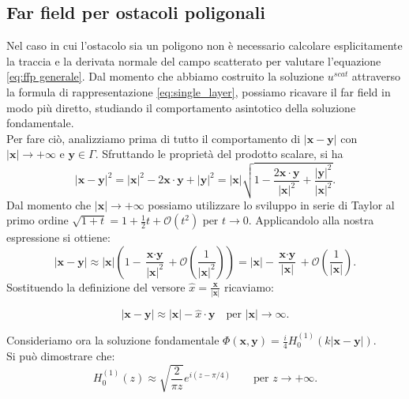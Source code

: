 \documentclass[a4paper,12pt]{article}
\theoremstyle{definition}
\begin{document}
\subsection{Far field per ostacoli poligonali}
Nel caso in cui l'ostacolo sia un poligono non è necessario calcolare esplicitamente la traccia e la derivata normale del campo scatterato per valutare l'equazione \ref{eq:ffp generale}. Dal momento che abbiamo costruito la soluzione $u^{scat}$ attraverso la formula di rappresentazione \ref{eq:single_layer}, possiamo ricavare il far field in modo più diretto, studiando il comportamento asintotico della soluzione fondamentale. \\
Per fare ciò, analizziamo prima di tutto il comportamento di $|\textbf{x}- \textbf{y}|$ con $|\textbf{x}| \rightarrow + \infty $ e $\textbf{y} \in \Gamma $. Sfruttando le proprietà del prodotto scalare, si ha
\begin{equation*}
	|\textbf{x}-\textbf{y}|^2 = |\textbf{x}|^2 - 2\textbf{x}\cdot \textbf{y} + |\textbf{y}|^2= |\textbf{x}| \sqrt{1- \frac{2\textbf{x}\cdot \textbf{y}}{|\textbf{x}|^2} + \frac{|\textbf{y}|^2}{|\textbf{x}|^2}}.
\end{equation*}
Dal momento che $|\textbf{x}|\rightarrow + \infty $ possiamo utilizzare lo sviluppo in serie di Taylor al primo ordine $\sqrt{1+t}= 1+\frac{1}{2}t + \mathcal{O}(t^2) \text{ per } t \rightarrow 0$. Applicandolo alla nostra espressione si ottiene:
\begin{equation*}
	|\textbf{x}-\textbf{y}| \approx |\textbf{x}| \left(1-\frac{\textbf{x}\cdot \textbf{y}}{|\textbf{x}|^2} + \mathcal{O}\left(\frac{1}{|\textbf{x}|^2}\right)\right) = |\textbf{x}|- \frac{\textbf{x}\cdot \textbf{y}}{|\textbf{x}|} + \mathcal{O}\left(\frac{1}{|\textbf{x}|}\right).
\end{equation*}
Sostituendo la definizione del versore $\hat{x} = \frac{\textbf{x}}{|\textbf{x}|} $ ricaviamo: 

\begin{equation}
	\label{eq:ffp con approssimazione distanza}
	|\textbf{x} - \textbf{y}| \approx |\textbf{x}| - \hat{x} \cdot \textbf{y} \quad \text{per } |\textbf{x}| \to \infty.
\end{equation}


Consideriamo ora la soluzione fondamentale $\Phi (\textbf{x}, \textbf{y})=\frac{i}{4}H_0^{(1)}(k|\textbf{x}-\textbf{y}|)$.\\
 Si può dimostrare che:
\begin{equation}
	\label{eq:soluzione fondamentale asintotica}
	H_0^{(1)}(z) \approx \sqrt{\frac{2}{\pi z}} e^{i(z-\pi/4)} \qquad \text{per } z \rightarrow + \infty.
\end{equation}
\end{document}
